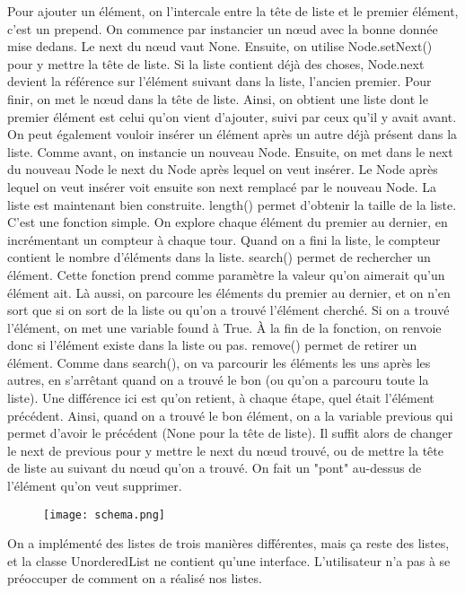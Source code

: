 \documentclass[10pt]{article}
\begin{document}
\newline \newline 
Pour ajouter un élément, on l'intercale entre la tête de liste et le premier élément, c'est un prepend. On commence par instancier un nœud avec la bonne donnée mise dedans. Le next du nœud vaut None. Ensuite, on utilise Node.setNext() pour y mettre la tête de liste. Si la liste contient déjà des choses, Node.next devient la référence sur l'élément suivant dans la liste, l'ancien premier. Pour finir, on met le nœud dans la tête de liste. Ainsi, on obtient une liste dont le premier élément est celui qu'on vient d'ajouter, suivi par ceux qu'il y avait avant.
\newline \newline 
On peut également vouloir insérer un élément après un autre déjà présent dans la liste. Comme avant, on instancie un nouveau Node. Ensuite, on met dans le next du nouveau Node le next du Node après lequel on veut insérer. Le Node après lequel on veut insérer voit ensuite son next remplacé par le nouveau Node. La liste est maintenant bien construite.
\newline \newline 
length() permet d'obtenir la taille de la liste. C'est une fonction simple. On explore chaque élément du premier au dernier, en incrémentant un compteur à chaque tour. Quand on a fini la liste, le compteur contient le nombre d'éléments dans la liste. 
\newline \newline 
search() permet de rechercher un élément. Cette fonction prend comme paramètre la valeur qu'on aimerait qu'un élément ait. Là aussi, on parcoure les éléments du premier au dernier, et on n'en sort que si on sort de la liste ou qu'on a trouvé l'élément cherché. Si on a trouvé l'élément, on met une variable found à True. À la fin de la fonction, on renvoie donc si l'élément existe dans la liste ou pas.
\newline \newline 
remove() permet de retirer un élément. Comme dans search(), on va parcourir les éléments les uns après les autres, en s'arrêtant quand on a trouvé le bon (ou qu'on a parcouru toute la liste). Une différence ici est qu'on retient, à chaque étape, quel était l'élément précédent. Ainsi, quand on a trouvé le bon élément, on a la variable previous qui permet d'avoir le précédent (None pour la tête de liste). Il suffit alors de changer le next de previous pour y mettre le next du nœud trouvé, ou de mettre la tête de liste au suivant du nœud qu'on a trouvé. On fait un "pont" au-dessus de l'élément qu'on veut supprimer. 
\begin{figure}[h!]
  \texttt{[image: schema.png]}
\end{figure}
\newline 
On a implémenté des listes de trois manières différentes, mais ça reste des listes, et la classe UnorderedList ne contient qu'une interface. L'utilisateur n'a pas à se préoccuper de comment on a réalisé nos listes.
\end{document}

